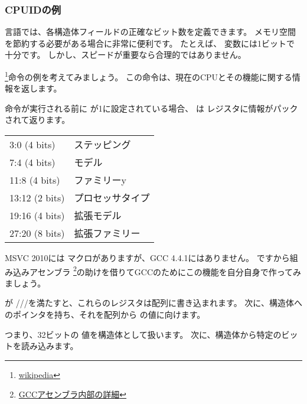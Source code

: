 ﻿\subsubsection{CPUIDの例}

\CCpp 言語では、各構造体フィールドの正確なビット数を定義できます。 
メモリ空間を節約する必要がある場合に非常に便利です。 
たとえば、 \Tbool 変数には1ビットで十分です。 
しかし、スピードが重要なら合理的ではありません。

\newcommand{\FNCPUID}{\footnote{\href{http://en.wikipedia.org/wiki/CPUID}{wikipedia}}}

\label{cpuid}

\CPUID\FNCPUID 命令の例を考えてみましょう。
この命令は、現在のCPUとその機能に関する情報を返します。

命令が実行される前に \EAX が1に設定されている場合、
\CPUID は \EAX レジスタに情報がパックされて返ります。

\begin{center}
\begin{tabular}{ | l | l | }
\hline
3:0 (4 bits)& ステッピング \\
7:4 (4 bits) & モデル \\
11:8 (4 bits) & ファミリーy \\
13:12 (2 bits) & プロセッサタイプ \\
19:16 (4 bits) & 拡張モデル \\
27:20 (8 bits) & 拡張ファミリー \\
\hline
\end{tabular}
\end{center}

\newcommand{\FNGCCAS}{\footnote{\href{http://www.ibiblio.org/gferg/ldp/GCC-Inline-Assembly-HOWTO.html}
{GCCアセンブラ内部の詳細}}}

MSVC 2010には \CPUID マクロがありますが、GCC 4.4.1にはありません。 
ですから組み込みアセンブラ \FNGCCAS の助けを借りてGCCのためにこの機能を自分自身で作ってみましょう。



\CPUID が \EAX/\EBX/\ECX/\EDX を満たすと、これらのレジスタは配列に書き込まれます。 
次に、構造体へのポインタを持ち、それを配列から \EAX の値に向けます。

つまり、32ビットの \Tint 値を構造体として扱います。 
次に、構造体から特定のビットを読み込みます。

